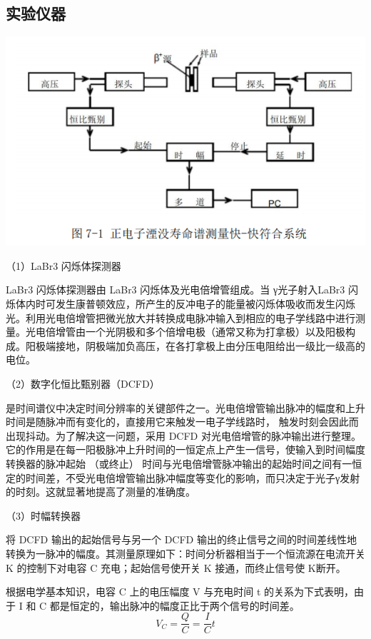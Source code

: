 \documentclass[hyperref]{ctexart}
\begin{document}
\begin{multicols}{2}
\subsection{实验仪器}
	\begin{center}\includegraphics[scale=0.4]{t71}\end{center}
	（1）LaBr3 闪烁体探测器

	LaBr3 闪烁体探测器由 LaBr3 闪烁体及光电倍增管组成。当 γ光子射入LaBr3 闪烁体内时可发生康普顿效应，所产生的反冲电子的能量被闪烁体吸收而发生闪烁光。利用光电倍增管把微光放大并转换成电脉冲输入到相应的电子学线路中进行测量。光电倍增管由一个光阴极和多个倍增电极（通常又称为打拿极）以及阳极构成。阳极端接地，阴极端加负高压，在各打拿极上由分压电阻给出一级比一级高的电位。

	（2）数字化恒比甄别器（DCFD）

	是时间谱仪中决定时间分辨率的关键部件之一。光电倍增管输出脉冲的幅度和上升时间是随脉冲而有变化的，直接用它来触发一电子学线路时， 触发时刻会因此而出现抖动。为了解决这一问题，采用 DCFD 对光电倍增管的脉冲输出进行整理。它的作用是在每一阳极脉冲上升时间的一恒定点上产生一信号，使输入到时间幅度转换器的脉冲起始 （或终止） 时间与光电倍增管脉冲输出的起始时间之间有一恒定的时间差，不受光电倍增管输出脉冲幅度等变化的影响，而只决定于光子γ发射的时刻。这就显著地提高了测量的准确度。

	（3）时幅转换器

	将 DCFD 输出的起始信号与另一个 DCFD 输出的终止信号之间的时间差线性地转换为一脉冲的幅度。其测量原理如下：时间分析器相当于一个恒流源在电流开关 K 的控制下对电容 C 充电；起始信号使开关 K 接通，而终止信号使 K断开。

	根据电学基本知识，电容 C 上的电压幅度 V 与充电时间 t 的关系为下式表明，由于 I 和 C 都是恒定的，输出脉冲的幅度正比于两个信号的时间差。
	\begin{equation}
	V_C=\frac Q C=\frac{I}{C}t
	\end{equation}


\end{multicols}
\end{document}
